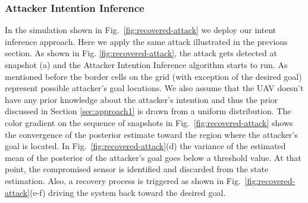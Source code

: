 \documentclass[letterpaper, 10 pt, conference]{ieeeconf}  %
\begin{document}

\subsubsection{Attacker Intention Inference}
In the simulation shown in Fig.~\ref{fig:recovered-attack} we deploy our intent inference approach. Here we apply the same attack illustrated in the previous section. 
As shown in Fig. \ref{fig:recovered-attack}, the attack gets detected at snapshot (a) and the Attacker Intention Inference algorithm starts to run. 
As mentioned before the border cells on the grid (with exception of the desired goal) represent possible attacker's goal locations. We also assume that the UAV doesn't have any prior knowledge about the attacker's intention and thus the prior discussed in Section \ref{sec:approach1} is drawn from a uniform distribution. The color gradient on the sequence of snapshots in Fig.~\ref{fig:recovered-attack} shows the convergence of the posterior estimate toward the region where the attacker's goal is located. In Fig.~\ref{fig:recovered-attack}(d) the variance of the estimated mean of the posterior of the attacker's goal goes below a threshold value. At that point, the compromised sensor is identified and discarded from the state estimation. Also, a recovery process is triggered as shown in Fig.~\ref{fig:recovered-attack}(e-f) driving the system back toward the desired goal. 

\end{document}
